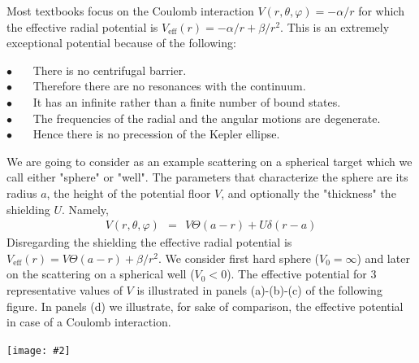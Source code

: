 \documentclass[onecolumn,fleqn]{revtex4}
\newcommand{\tbox}[1]{\text{#1}}
\newcommand{\bitem}{$\bullet$ \ \ \ }
\newcommand{\putgraph}[2][0.30\hsize]{\texttt{[image: \#2]}}
\newcommand{\beq}{\begin{eqnarray}}
\newcommand{\eeq}{\end{eqnarray}}
\begin{document}
Most textbooks focus on the Coulomb interaction
${V(r,\theta,\varphi)=-\alpha/r}$
for which the effective radial potential 
is ${ V_{\tbox{eff}}(r) = -\alpha/r + \beta/r^2 }$.
This is an extremely exceptional potential 
because of the following: 

\bitem There is no centrifugal barrier. \\
\bitem Therefore there are no resonances with the continuum. \\
\bitem It has an infinite rather than a finite number of bound states. \\
\bitem The frequencies of the radial and the angular motions are degenerate. \\
\bitem Hence there is no precession of the Kepler ellipse.


We are going to consider as an example 
scattering on a spherical target 
which we call either "sphere" or "well".
The parameters that characterize the sphere 
are its radius $a$, the height of the 
potential floor $V$, and optionally 
the "thickness" the shielding $U$. Namely, 
\beq
V(r,\theta,\varphi) \ \ = \ \ V \Theta(a-r) + U\delta(r-a)
\eeq
Disregarding the shielding the effective radial potential 
is ${ V_{\tbox{eff}}(r) = V\Theta(a-r) + \beta/r^2 }$.
We consider first hard sphere ($V_0=\infty$) and later 
on the scattering on a spherical well ($V_0<0$).
The effective potential for 3 representative  
values of $V$ is illustrated in panels (a)-(b)-(c) 
of the following figure. In panels (d) we illustrate,  
for sake of comparison, the effective potential 
in case of a Coulomb interaction.   


\begin{center}
\putgraph[0.7\hsize]{EffectivePotential}
\end{center}
\end{document}
